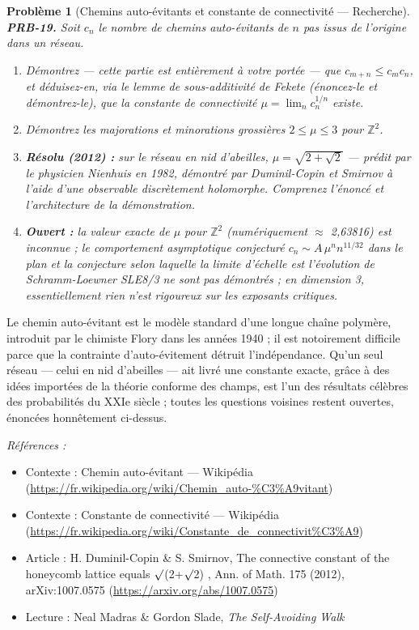 \documentclass[11pt]{article}
\newtheorem{problem}{Problème}
\newenvironment{refs}{\par\small\noindent\emph{Références :}\begin{itemize}\setlength\itemsep{0pt}}{\end{itemize}\normalsize}
\begin{document}
\begin{problem}[{Chemins auto-évitants et constante de connectivité --- Recherche}]
\textbf{PRB-19.} Soit $ c_n $ le nombre de chemins auto-évitants de
$ n $ pas issus de l'origine dans un réseau.
\begin{enumerate}
\item[(i)] Démontrez --- cette partie est entièrement à votre portée --- que $ c_{m+n} \le c_m c_n $, et
déduisez-en, via le lemme de sous-additivité de Fekete (énoncez-le et démontrez-le), que la
\textit{constante de connectivité} $ \mu = \lim_n c_n^{1/n} $ existe.
\item[(ii)] Démontrez les majorations et minorations grossières $ 2 \le \mu \le 3 $ pour
$ \mathbb{Z}^2 $.
\item[(iii)] \textbf{Résolu (2012) :} sur le réseau en nid d'abeilles,
$ \mu = \sqrt{2 + \sqrt{2}} $ --- prédit par le physicien Nienhuis en 1982, démontré par
Duminil-Copin et Smirnov à l'aide d'une observable discrètement holomorphe. Comprenez l'énoncé et
l'architecture de la démonstration.
\item[(iv)] \textbf{Ouvert :} la valeur exacte de $ \mu $ pour $ \mathbb{Z}^2 $ (numériquement
$\approx$ 2,63816) est inconnue ; le comportement asymptotique conjecturé
$ c_n \sim A\,\mu^n n^{11/32} $ dans le plan et la conjecture selon laquelle la limite d'échelle
est l'évolution de Schramm-Loewner SLE8/3 ne sont pas démontrés ; en dimension 3,
essentiellement rien n'est rigoureux sur les exposants critiques.
\end{enumerate}

\end{problem}

\noindent Le chemin auto-évitant est le modèle standard d'une longue chaîne polymère,
introduit par le chimiste Flory dans les années 1940 ; il est notoirement difficile parce que la
contrainte d'auto-évitement détruit l'indépendance. Qu'un seul réseau --- celui en nid d'abeilles ---
ait livré une constante exacte, grâce à des idées importées de la théorie conforme des champs, est
l'un des résultats célèbres des probabilités du XXIe siècle ; toutes les questions
voisines restent ouvertes, énoncées honnêtement ci-dessus.

\begin{refs}
\item Contexte : Chemin auto-évitant --- Wikipédia (\url{https://fr.wikipedia.org/wiki/Chemin_auto-%C3%A9vitant})
\item Contexte : Constante de connectivité --- Wikipédia (\url{https://fr.wikipedia.org/wiki/Constante_de_connectivit%C3%A9})
\item Article : H. Duminil-Copin \& S. Smirnov, \og{} The connective constant of the honeycomb lattice equals $\surd$(2+$\surd$2) \fg{}, Ann. of Math. 175 (2012), arXiv:1007.0575 (\url{https://arxiv.org/abs/1007.0575})
\item Lecture : Neal Madras \& Gordon Slade, \textit{The Self-Avoiding Walk}
\end{refs}
\end{document}
